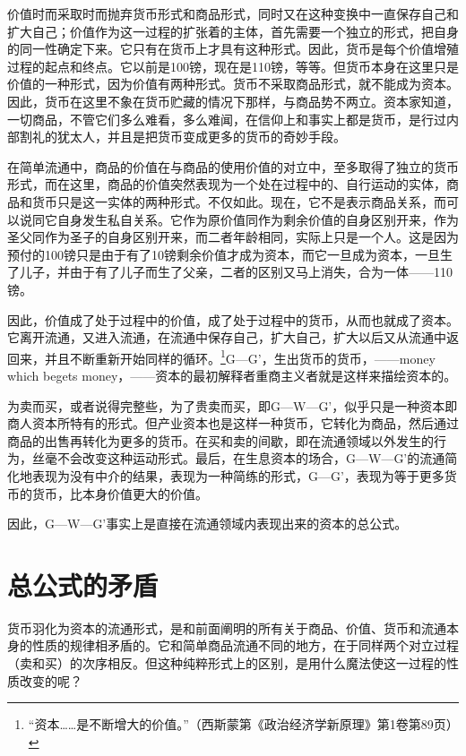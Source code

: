 \documentclass{ctexbook}
\begin{document}
    价值时而采取时而抛弃货币形式和商品形式，同时又在这种变换中一直保存自己和扩大自己；价值作为这一过程的扩张着的主体，首先需要一个独立的形式，把自身的同一性确定下来。它只有在货币上才具有这种形式。因此，货币是每个价值增殖过程的起点和终点。它以前是100镑，现在是110镑，等等。但货币本身在这里只是价值的一种形式，因为价值有两种形式。货币不采取商品形式，就不能成为资本。因此，货币在这里不象在货币贮藏的情况下那样，与商品势不两立。资本家知道，一切商品，不管它们多么难看，多么难闻，在信仰上和事实上都是货币，是行过内部割礼的犹太人，并且是把货币变成更多的货币的奇妙手段。

    在简单流通中，商品的价值在与商品的使用价值的对立中，至多取得了独立的货币形式，而在这里，商品的价值突然表现为一个处在过程中的、自行运动的实体，商品和货币只是这一实体的两种形式。不仅如此。现在，它不是表示商品关系，而可以说同它自身发生私自关系。它作为原价值同作为剩余价值的自身区别开来，作为圣父同作为圣子的自身区别开来，而二者年龄相同，实际上只是一个人。这是因为预付的100镑只是由于有了10镑剩余价值才成为资本，而它一旦成为资本，一旦生了儿子，并由于有了儿子而生了父亲，二者的区别又马上消失，合为一体——110镑。

    因此，价值成了处于过程中的价值，成了处于过程中的货币，从而也就成了资本。它离开流通，又进入流通，在流通中保存自己，扩大自己，扩大以后又从流通中返回来，并且不断重新开始同样的循环。\footnote{“资本……是不断增大的价值。”（西斯蒙第《政治经济学新原理》第1卷第89页）}G—G'，生出货币的货币，——money which begets money，——资本的最初解释者重商主义者就是这样来描绘资本的。

    为卖而买，或者说得完整些，为了贵卖而买，即G—W—G'，似乎只是一种资本即商人资本所特有的形式。但产业资本也是这样一种货币，它转化为商品，然后通过商品的出售再转化为更多的货币。在买和卖的间歇，即在流通领域以外发生的行为，丝毫不会改变这种运动形式。最后，在生息资本的场合，G—W—G'的流通简化地表现为没有中介的结果，表现为一种简练的形式，G—G'，表现为等于更多货币的货币，比本身价值更大的价值。

    因此，G—W—G'事实上是直接在流通领域内表现出来的资本的总公式。

    \section{总公式的矛盾}

    货币羽化为资本的流通形式，是和前面阐明的所有关于商品、价值、货币和流通本身的性质的规律相矛盾的。它和简单商品流通不同的地方，在于同样两个对立过程（卖和买）的次序相反。但这种纯粹形式上的区别，是用什么魔法使这一过程的性质改变的呢？
\end{document}

